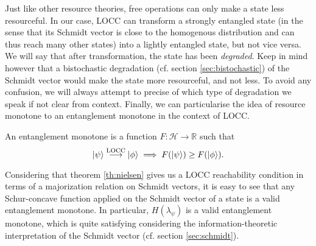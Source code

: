 Just like other resource theories, free operations can only make a state less resourceful. In our case, LOCC can transform a strongly entangled state (in the sense that its Schmidt vector is close to the homogenous distribution and can thus reach many other states) into a lightly entangled state, but not vice versa. We will say that after transformation, the state has been \textit{degraded}. Keep in mind however that a bistochastic degradation (cf. section \ref{sec:bistochastic}) of the Schmidt vector would make the state more resourceful, and not less. To avoid any confusion, we will always attempt to precise of which type of degradation we speak if not clear from context. Finally, we can particularise the idea of resource monotone to an entanglement monotone in the context of LOCC.

\begin{definition}
    An entanglement monotone is a function $F: \mathcal{H} \rightarrow \mathbb{R}$ such that
    \begin{equation}
        \ket{\psi} \overset{\text{LOCC}}{\longrightarrow} \ket{\phi} \implies F(\ket{\psi}) \geq F(\ket{\phi}).
    \end{equation}
\end{definition}

\begin{remark} \label{rem:schmidt_probability_analogy}
    Considering that theorem \ref{th:nielsen} gives us a LOCC reachability condition in terms of a majorization relation on Schmidt vectors, it is easy to see that any Schur-concave function applied on the Schmidt vector of a state is a valid entanglement monotone. In particular, $H(\lambda_\psi)$ is a valid entanglement monotone, which is quite satisfying considering the information-theoretic interpretation of the Schmidt vector (cf. section \ref{sec:schmidt}).
\end{remark}

